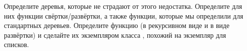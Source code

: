\begin{itemize}
  Определите деревья, которые не страдают от этого недостатка.
  Определите для них функции свёртки/развёртки, а также функции, которые
  мы определили для стандартных деревьев. Определите функцию
   (в рекурсивном виде и в виде развёртки) и сделайте их
  экземпляром класса , похожий на экземпляр для списков.
\end{itemize}
